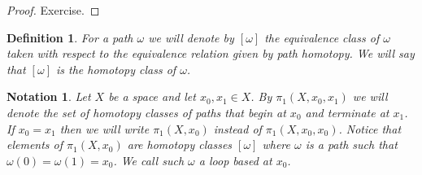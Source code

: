 \documentclass[11pt, letterpaper, oneside]{report}
\theoremstyle{pplain}
\theoremstyle{ddefinition}
\newtheorem{definition}[theorem]{Definition}
\newtheorem{notation}[theorem]{Notation}
\theoremstyle{nnn}
\theoremstyle{eexercise}
\begin{document}
 
\begin{proof}
Exercise. 
\end{proof}

\begin{definition}
For a path $\omega$ we will denote by $[\omega]$ the equivalence class of $\omega$ taken with respect 
to  the equivalence relation given by path homotopy. We will say that $[\omega]$ is the \emph{homotopy class} of $\omega$.
\end{definition}

\begin{notation}
Let $X$ be a space and let $x_{0}, x_{1}\in X$. By $\pi_{1}(X, x_{0}, x_{1})$ we will denote the set of
homotopy classes of paths that begin at $x_{0}$ and terminate at $x_{1}$.  If $x_{0} = x_{1}$ then 
we will write $\pi_{1}(X, x_{0})$ instead of $\pi_{1}(X, x_{0}, x_{0})$. Notice that elements 
of $\pi_{1}(X, x_{0})$ are homotopy classes $[\omega]$ where $\omega$ is a path such that 
$\omega(0) = \omega(1) = x_{0}$. We call such $\omega$ a \emph{loop} based at $x_{0}$. 
\end{notation}
\end{document}
